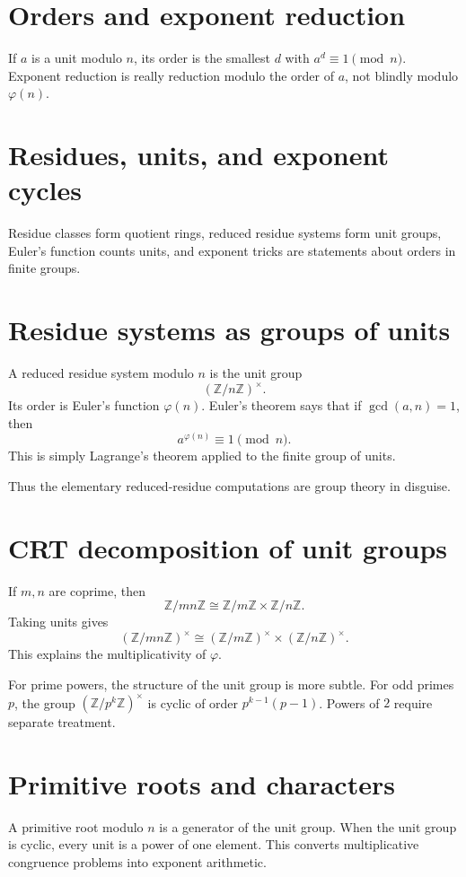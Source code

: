 \section{Orders and exponent reduction}
If \(a\) is a unit modulo \(n\), its order is the smallest \(d\) with \(a^d\equiv1\pmod n\).  Exponent reduction is really reduction modulo the order of \(a\), not blindly modulo \(\varphi(n)\).
\section{Residues, units, and exponent cycles}
Residue classes form quotient rings, reduced residue systems form unit groups, Euler's function counts units, and exponent tricks are statements about orders in finite groups.

\section{Residue systems as groups of units}

A reduced residue system modulo $n$ is the unit group
\[
  (\mathbb Z/n\mathbb Z)^\times.
\]
Its order is Euler's function $\varphi(n)$.  Euler's theorem says that if $\gcd(a,n)=1$, then
\[
  a^{\varphi(n)}\equiv1\pmod n.
\]
This is simply Lagrange's theorem applied to the finite group of units.

Thus the elementary reduced-residue computations are group theory in disguise.

\section{CRT decomposition of unit groups}

If $m,n$ are coprime, then
\[
  \mathbb Z/mn\mathbb Z\cong \mathbb Z/m\mathbb Z\times \mathbb Z/n\mathbb Z.
\]
Taking units gives
\[
  (\mathbb Z/mn\mathbb Z)^\times\cong
  (\mathbb Z/m\mathbb Z)^\times\times(\mathbb Z/n\mathbb Z)^\times.
\]
This explains the multiplicativity of $\varphi$.

For prime powers, the structure of the unit group is more subtle.  For odd primes $p$, the group $(\mathbb Z/p^k\mathbb Z)^\times$ is cyclic of order $p^{k-1}(p-1)$.  Powers of $2$ require separate treatment.

\section{Primitive roots and characters}

A primitive root modulo $n$ is a generator of the unit group.  When the unit group is cyclic, every unit is a power of one element.  This converts multiplicative congruence problems into exponent arithmetic.

